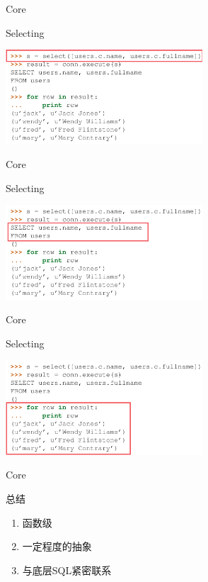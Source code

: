 \documentclass{beamer}
\begin{document}
\begin{frame}{Core}
\begin{block}{Selecting}
\begin{center}
    \includegraphics[height=100pt]{oop_image/core_select1.png}
\end{center}
\end{block}
\end{frame}

\begin{frame}{Core}
\begin{block}{Selecting}
\begin{center}
    \includegraphics[height=100pt]{oop_image/core_select2.png}
\end{center}
\end{block}
\end{frame}
\begin{frame}{Core}
\begin{block}{Selecting}
\begin{center}
    \includegraphics[height=100pt]{oop_image/core_select3.png}
\end{center}
\end{block}
\end{frame}

\begin{frame}{Core}
\begin{block}{总结}
\begin{enumerate}
    \item 函数级
    \item 一定程度的抽象
    \item 与底层SQL紧密联系
\end{enumerate}
\end{block}
\end{frame}
\end{document}
